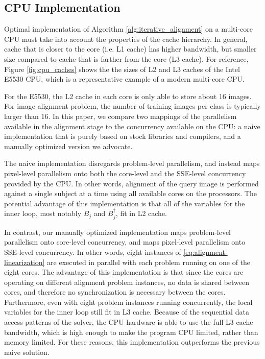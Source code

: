 \documentclass[preprint]{sigplanconf}
\begin{document}
\subsection{CPU Implementation} 
\label{sec:alignment_implementation_cpu}

Optimal implementation of Algorithm \ref{alg:iterative_alignment} on a multi-core CPU must take 
into account the properties of the cache hierarchy. In general, cache that is 
closer to the core (i.e. L1 cache) has higher bandwidth, but smaller size compared to cache
that is farther from the core (L3 cache).  For reference, Figure \ref{fig:cpu_caches} 
shows the the sizes of L2 and L3 caches of the Intel E5530 CPU, 
which is a representative example of a modern multi-core CPU. 

For the E5530, the L2 cache in each core is only able to store about 16 images.
For image alignment problem, the number of training images per class is
typically larger than 16.  
In this paper, we compare two mappings of the parallelism available in the alignment
stage to the concurrency available on the CPU: a naive implementation that is purely 
based on stock libraries and compilers, and a manually optimized version we advocate.

The naive implementation disregards 
problem-level parallelism, and instead maps pixel-level parallelism
onto both the core-level and the SSE-level concurrency provided by the CPU.  In
other words, alignment of the query image is performed
against a single subject at a time using all available cores on
the processors.  The potential advantage of this implementation is that all of the variables
for the inner loop, most notably $B_j$ and $B_j^\dagger$, fit in L2 cache.  

In contrast, our manually optimized implementation maps problem-level parallelism onto core-level
concurrency, and maps pixel-level parallelism onto SSE-level concurrency.  In
other words, eight instances of \eqref{eq:alignment-linearization} are executed
in parallel with each problem running on one of the eight cores.  The advantage
of this implementation is that since the cores are operating on different
alignment problem instances, no data is shared between cores, and therefore no
synchronization is necessary between the cores.  Furthermore, even with eight
problem instances running concurrently, the local variables for the inner
loop still fit in L3 cache.  Because of the sequential data access patterns of
the solver, the CPU hardware is able to use the full L3 cache bandwidth, which is 
high enough to make the program CPU limited, rather than memory limited.  
For these reasons, this implementation outperforms the previous naive solution.
\end{document}
